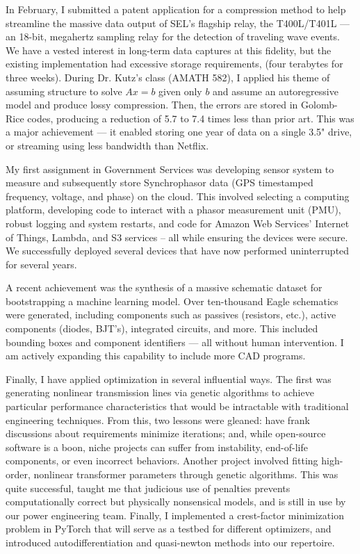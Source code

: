 \documentclass[letterpaper]{article}
\begin{document}
In February, I submitted a patent application for a compression method
to help streamline the massive data output of SEL's flagship relay, the T400L/T401L --- an
18-bit, megahertz sampling relay for the detection of traveling wave events.
We have a vested interest in long-term data captures at this
fidelity, but the existing implementation had excessive storage requirements,
(four terabytes for three weeks). During Dr. Kutz's class (AMATH 582), I applied his theme of
assuming structure to solve $Ax=b$ given only $b$ and
assume an autoregressive model and produce lossy compression. Then, the errors are stored in
Golomb-Rice codes, producing a reduction of 5.7 to 7.4 times less than prior art.
This was a major achievement --- it enabled storing one year of data on a single 3.5"
drive, or streaming using less bandwidth than Netflix.

My first assignment in Government Services was developing sensor system to measure and subsequently
store Synchrophasor data (GPS timestamped frequency, voltage, and phase) on the cloud. This involved
selecting a computing platform, developing code to interact with a phasor measurement unit (PMU),
robust logging and system restarts, and code for Amazon Web Services' Internet of Things,
Lambda, and S3 services -- all while ensuring the devices were secure. We successfully deployed
several devices that have now performed uninterrupted for several years.


A recent achievement was the synthesis of a massive schematic dataset for bootstrapping a machine
learning model. Over ten-thousand Eagle schematics were generated, including components such as
passives (resistors, etc.), active components (diodes, BJT's), integrated circuits, and more.
This included bounding boxes and component identifiers --- all without human intervention. I am
actively expanding this capability to include more CAD programs.

Finally, I have applied optimization in several influential ways. The first was generating
nonlinear transmission lines via genetic algorithms to achieve particular performance
characteristics that would be intractable with traditional engineering techniques.
From this, two lessons were gleaned: have frank discussions about
requirements minimize iterations; and, while open-source software is a boon, niche projects can
suffer from instability, end-of-life components, or even incorrect behaviors.
Another project involved fitting high-order, nonlinear transformer parameters through genetic
algorithms. This was quite successful, taught me that judicious use of penalties prevents
computationally correct but physically nonsensical models, and is still in use by our power
engineering team. Finally, I implemented a crest-factor minimization problem in PyTorch that will
serve as a testbed for different optimizers, and introduced autodifferentiation and quasi-newton
methods into our repertoire.
\end{document}
